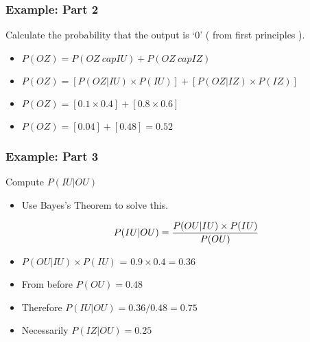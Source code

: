 ﻿\documentclass[a4]{beamer}
\begin{document}
\begin{frame}
\frametitle{Example: Part 2}
Calculate the probability that the output is `0' ( from first principles ).
\begin{itemize}
\item $P(OZ) = P(OZ \ cap IU) + P(OZ \ cap IZ)$

\item $P(OZ) = [P(OZ|IU) \times P(IU) ] + [P(OZ|IZ) \times P(IZ) ]$

\item $P(OZ) = [0.1 \times 0.4 ] + [0.8 \times 0.6 ]$

\item $P(OZ) = [0.04] + [0.48] = \boldsymbol{0.52}$
\end{itemize}

\end{frame}
\begin{frame}
\frametitle{Example: Part 3}
Compute $P(IU|OU)$ 

\begin{itemize}
\item Use Bayes's Theorem to solve this.

\[P(IU|OU) = { P(OU|IU) \times P(IU)\over P(OU) } \]

\item $P(OU|IU)\times P(IU)$ = $0.9 \times 0.4 = 0.36$
\item From before $P(OU) = 0.48$
\item Therefore $P(IU|OU) = 0.36 / 0.48 = \boldsymbol{0.75}$
\item Necessarily $P(IZ|OU)  = 0.25$
\end{itemize}

\end{frame}
\end{document}
